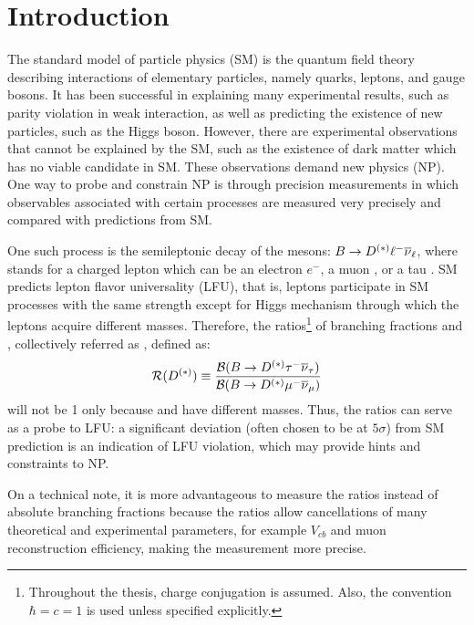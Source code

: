 \chapter{Introduction}
\label{ref:intro}

The standard model of particle physics (SM)
is the quantum field theory describing interactions of elementary particles,
namely quarks, leptons, and gauge bosons.
It has been successful in explaining many experimental results, such as parity
violation in weak interaction,
as well as predicting the existence of new particles, such as the Higgs boson.
However,
there are experimental observations that cannot be explained by the SM,
such as the existence of dark matter
which has no viable candidate in SM.
These observations demand new physics (NP).
One way to probe and constrain NP is through precision measurements
in which observables associated with certain processes are measured very
precisely and compared with predictions from SM.

One such process is the semileptonic decay of the \B mesons:
$B \rightarrow D^{(*)} {\ell^-} {{\overline{\nu}}_\ell}$,
where \ellm stands for a charged lepton which can be an electron $e^-$,
a muon \mun, or a tau \taum.
SM predicts lepton flavor universality (LFU),
that is, leptons participate in SM processes with the same strength
except for Higgs mechanism through which the leptons acquire different masses.
Therefore,
the ratios\footnote{
    Throughout the thesis, charge conjugation is assumed.
    Also, the convention $\hbar = c = 1$ is used unless specified explicitly.
} of branching fractions \RD and \RDst,
collectively referred as \RDX, defined as:
\begin{equation}
    \mathcal{R}(D^{(*)}) \equiv \frac{\mathcal{B}(B \rightarrow D^{(*)} {\tau^-} {{\overline{\nu}}_\tau})}{\mathcal{B}(B \rightarrow D^{(*)} {\mu^-} {{\overline{\nu}}_\mu})}
\end{equation}
will not be 1 only because \taum and \mun have different masses.
Thus, the ratios can serve as a probe to LFU:
a significant deviation (often chosen to be at $5\sigma$) from SM prediction is
an indication of LFU violation,
which may provide hints and constraints to NP.

On a technical note,
it is more advantageous to measure the ratios instead of absolute
branching fractions because the ratios allow cancellations of many
theoretical and experimental parameters,
for example $V_{cb}$ and muon reconstruction efficiency,
making the measurement more precise.

